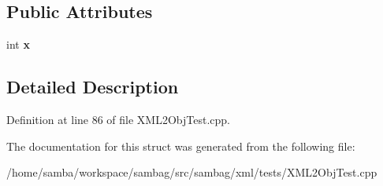 \subsection*{Public Attributes}
\begin{DoxyCompactItemize}
\item 
\hypertarget{struct_object_a_a0637988cc6653761f9d0dc14b5343c18}{
int {\bfseries x}}
\label{struct_object_a_a0637988cc6653761f9d0dc14b5343c18}

\end{DoxyCompactItemize}


\subsection{Detailed Description}


Definition at line 86 of file XML2ObjTest.cpp.



The documentation for this struct was generated from the following file:\begin{DoxyCompactItemize}
\item 
/home/samba/workspace/sambag/src/sambag/xml/tests/XML2ObjTest.cpp\end{DoxyCompactItemize}

